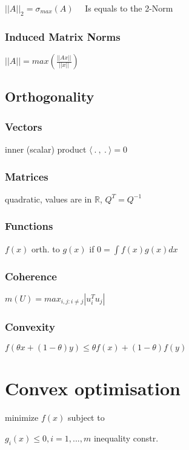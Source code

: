 \documentclass[a4paper,11pt,twocolumn]{article}
\begin{document}
$||A||_2 = \sigma_{max}(A)$ 
~~Is equals to the 2-Norm

\subsubsection{Induced Matrix Norms}
$ ||A|| = max \left( \frac{ ||Ax|| }{ ||x|| } \right)$

\subsection{Orthogonality}

\subsubsection{Vectors} 

inner (scalar) product $\langle ~.~,~.~ \rangle = 0$

\subsubsection{Matrices} 

quadratic, values are in $\mathbb{R}$, $Q^T = Q^{-1}$

\subsubsection{Functions}

$f(x)$ orth. to $g(x)$ if $0 = \int f(x) g(x) dx $

\subsubsection{Coherence}

$m(U)= max_{i,j:i\neq j} | u_i^T u_j|$

\subsubsection{Convexity}

$f(\theta x + (1-\theta)y) \leq \theta f(x) + (1-\theta) f(y)$


\section{Convex optimisation}

minimize $f(x)$ subject to 

$g_i(x) \leq 0, i = 1,...,m$ inequality constr.
\end{document}
